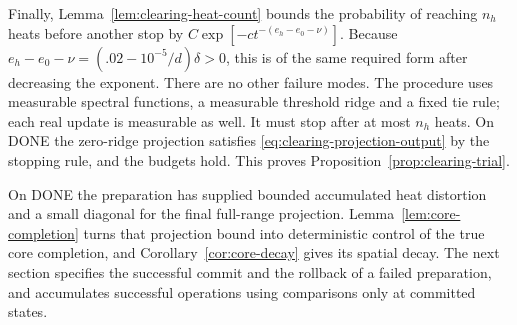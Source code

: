 Finally, Lemma~\ref{lem:clearing-heat-count} bounds the probability of reaching
$n_h$ heats before another stop by
$C\exp[-c t^{-(e_h-e_0-\nu)}]$.  Because
$e_h-e_0-\nu=(.02-10^{-5}/d)\delta>0$, this is of the same required form after
decreasing the exponent.  There are no other failure modes.  The procedure
uses measurable spectral functions, a measurable threshold ridge and a fixed
tie rule; each real update is measurable as well.  It must stop after at most
$n_h$ heats.  On DONE the zero-ridge projection satisfies
\eqref{eq:clearing-projection-output} by the stopping rule, and the budgets
hold.  This proves Proposition~\ref{prop:clearing-trial}.

On DONE the preparation has supplied bounded accumulated heat distortion and
a small diagonal for the final full-range projection. Lemma~\ref{lem:core-completion}
turns that projection bound into deterministic control of the true core
completion, and Corollary~\ref{cor:core-decay} gives its spatial decay.
The next section specifies the successful commit and the rollback of a
failed preparation, and accumulates successful operations using comparisons
only at committed states.
